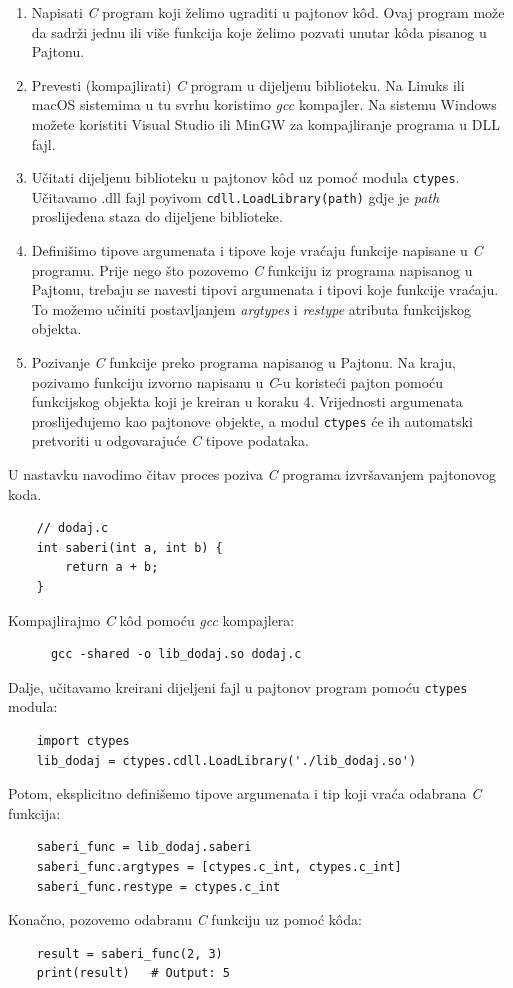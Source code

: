 \begin{enumerate}
	\item Napisati \textit{C} program koji želimo ugraditi u pajtonov   k\^od. Ovaj program može da sadrži jednu ili više funkcija koje želimo pozvati unutar k\^oda pisanog u Pajtonu.
	\item Prevesti (kompajlirati) \textit{C} program u dijeljenu biblioteku.    Na Linuks ili macOS  sistemima u tu svrhu koristimo \textit{gcc} kompajler. Na sistemu Windows možete koristiti Visual Studio ili MinGW za kompajliranje programa u DLL fajl.
	\item Učitati dijeljenu biblioteku u pajtonov k\^od uz  pomoć modula \texttt{ctypes}. Učitavamo .dll fajl poyivom \texttt{cdll.LoadLibrary(path)} gdje je \textit{path} proslijeđena staza do dijeljene biblioteke.
	\item Definišimo tipove argumenata i tipove koje vraćaju funkcije napi\-sane u \textit{C} programu. Prije nego što   pozovemo \textit{C} funkciju iz programa napisanog u Pajtonu, trebaju se navesti tipovi argume\-nata i tipovi koje funkcije vraćaju. To možemo učiniti postavlja\-njem \textit{argtypes} i \textit{restype} atributa funkcijskog objekta.
	\item Pozivanje \textit{C} funkcije preko programa napisanog u Pajtonu. Na kraju, pozivamo funkciju izvorno napisanu u \textit{C}-u koristeći pajton pomoću funkcijskog objekta koji je kreiran u koraku 4. Vrijednosti argumenata proslijeđujemo kao pajtonove objekte, a modul \texttt{ctypes} će ih automatski pretvoriti u odgovarajuće \textit{C} tipove podataka. 
\end{enumerate}

U nastavku navodimo čitav proces   poziva \textit{C} programa izvršavanjem pajtonovog koda.


\begin{verbatim}
	// dodaj.c
	int saberi(int a, int b) {
		return a + b;
	}
\end{verbatim}

Kompajlirajmo \textit{C} k\^od pomoću \textit{gcc} kompajlera:
\begin{verbatim}
	  gcc -shared -o lib_dodaj.so dodaj.c
\end{verbatim}
Dalje, učitavamo kreirani dijeljeni fajl u pajtonov program pomoću  \texttt{ctypes} modula:
\begin{verbatim}
	import ctypes
	lib_dodaj = ctypes.cdll.LoadLibrary('./lib_dodaj.so')
\end{verbatim}
Potom, eksplicitno definišemo tipove argumenata i tip koji vraća odabrana \textit{C} funkcija:
\begin{verbatim}
	saberi_func = lib_dodaj.saberi
	saberi_func.argtypes = [ctypes.c_int, ctypes.c_int]
	saberi_func.restype = ctypes.c_int
\end{verbatim}
Konačno, pozovemo odabranu \textit{C} funkciju uz pomoć k\^oda:
\begin{verbatim}
	result = saberi_func(2, 3)
	print(result)   # Output: 5
\end{verbatim}

